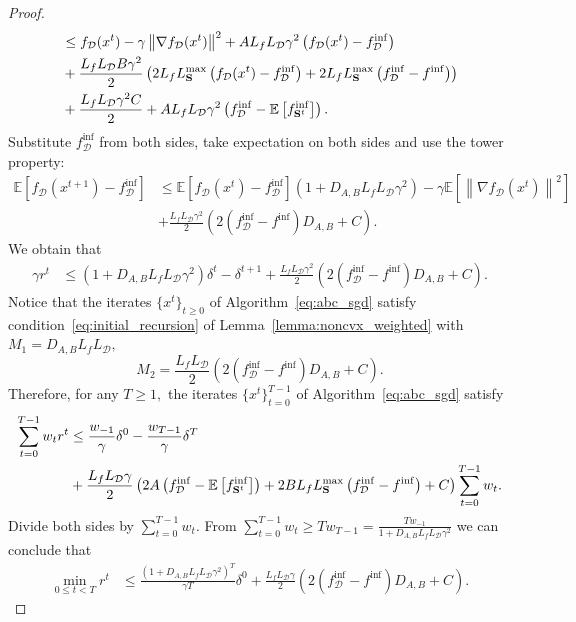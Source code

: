 \documentclass{article}
\newcommand{\bb}{\mathbb}
\newcommand{\Exp}[1]{{\bb E}\left[#1\right]}
\theoremstyle{plain}
\newcommand{\tf}{f_{\mathcal{D}}}
\newcommand{\mS}{{\bf S}}
\theoremstyle{plain}
\theoremstyle{definition}
\theoremstyle{remark}
\begin{document}
\begin{proof}
\begin{equation*}
\begin{split}
			& \leq \tf(x^t)-\gamma  \left\|\nabla\tf(x^t)\right\|^2 + AL_fL_{\mathcal{D}}\gamma^2\left(\tf(x^t) - \tf^{\inf}\right)\\
			& + \frac{L_fL_{\mathcal{D}}B\gamma^2}{2}\left(2L_fL_{\mS}^{\max} \left(\tf(x^t) - \tf^{\inf}\right)+ 2L_fL_{\mS}^{\max} \left(\tf^{\inf} - f^{\inf}\right)\right)\\
			& + \frac{L_fL_{\mathcal{D}}\gamma^2C}{2} + AL_fL_{\mathcal{D}}\gamma^2\left(\tf^{\inf} - \Exp{f_{\mS^{t}}^{\inf}}\right).\\
		\end{split}
	\end{equation*}
	Substitute $\tf^{\inf}$ from both sides, take expectation on both sides and use the tower property:
	\begin{equation*}
		\begin{split}
			\Exp{\tf(x^{t+1}) - \tf^{\inf}} & \leq \Exp{\tf(x^{t}) - \tf^{\inf}}\left(1+D_{A,B}L_fL_{\mathcal{D}}\gamma^2\right) - \gamma  \Exp{\left\|\nabla\tf(x^t)\right\|^2} \\
			& + \frac{L_fL_{\mathcal{D}}\gamma^2}{2}\left(2\left(\tf^{\inf} - f^{\inf}\right)D_{A,B} + C\right).
		\end{split}
	\end{equation*}
	We obtain that
	\begin{equation*}
		\begin{split}
			\gamma r^t &\leq \left(1+D_{A,B}L_fL_{\mathcal{D}}\gamma^2\right)\delta^t- \delta^{t+1}
			+ \frac{L_fL_{\mathcal{D}}\gamma^2}{2}\left(2\left(\tf^{\inf} - f^{\inf}\right)D_{A,B} + C\right).
		\end{split}
	\end{equation*}
	Notice that the iterates $\{x^t\}_{t\geq 0}$ of Algorithm~\ref{eq:abc_sgd} satisfy condition~\eqref{eq:initial_recursion} of Lemma~\ref{lemma:noncvx_weighted} with $M_1=D_{A,B}L_fL_{\mathcal{D}},$
	$$
	M_2=\frac{L_fL_{\mathcal{D}}}{2}\left(2\left(\tf^{\inf} - f^{\inf}\right)D_{A,B} + C\right)
	.
	$$
	Therefore, for any $T\geq 1,$ the iterates $\{x^t\}_{t=0}^{T-1}$ of Algorithm~\ref{eq:abc_sgd} satisfy
	\begin{equation*}
		\begin{split}
			\sum_{t=0}^{T-1}w_tr^t & \leq \frac{w_{-1}}{\gamma}\delta^0 - \frac{w_{T-1}}{\gamma}\delta^{T}\\
			& + \frac{L_fL_{\mathcal{D}}\gamma}{2}\left(2A\left(\tf^{\inf} - \Exp{f_{\mS^{t}}^{\inf}}\right)+2BL_fL_{\mS}^{\max} \left(\tf^{\inf} - f^{\inf}\right) + C\right)\sum_{t=0}^{T-1}w_t.
		\end{split}
	\end{equation*}
	Divide both sides by $\sum_{t=0}^{T-1}w_t.$ From $\sum_{t=0}^{T-1}w_t\geq Tw_{T-1} = \frac{Tw_{-1}}{1+D_{A,B}L_fL_{\mathcal{D}}\gamma^2}$ we can conclude that
	\begin{equation*}
		\begin{split}
			\min_{0 \leq t < T}r^t &\leq \frac{\left(1+D_{A,B}L_fL_{\mathcal{D}}\gamma^2\right)^T}{\gamma T}\delta^0
			+ \frac{L_fL_{\mathcal{D}}\gamma}{2}\left(2\left(\tf^{\inf} - 	f^{\inf}\right)D_{A,B} + C\right).
		\end{split}
	\end{equation*}
\end{proof}
\end{document}
